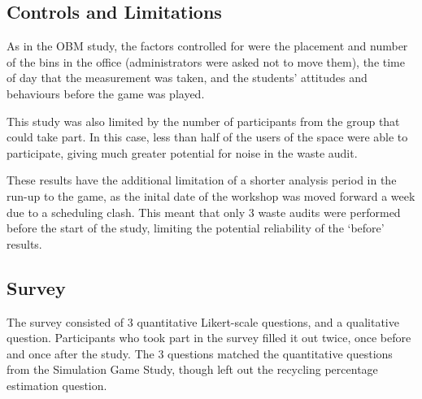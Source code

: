 \documentclass[nofonts,nols,justified,nobib]{tufte-book}
\begin{document}
\subsection*{Controls and Limitations}
As in the OBM study, the factors controlled for were the placement and number of the bins in the office (administrators were asked not to move them), the time of day that the measurement was taken, and the students' attitudes and behaviours before the game was played.

This study was also limited by the number of participants from the group that could take part. In this case, less than half of the users of the space were able to participate, giving much greater potential for noise in the waste audit. 

These results have the additional limitation of a shorter analysis period in the run-up to the game, as the inital date of the workshop was moved forward a week due to a scheduling clash. This meant that only 3 waste audits were performed before the start of the study, limiting the potential reliability of the `before' results.

\subsection*{Survey}
The survey consisted of 3 quantitative Likert-scale questions, and a qualitative question. Participants who took part in the survey filled it out twice, once before and once after the study. The 3 questions matched the quantitative questions from the Simulation Game Study, though left out the recycling percentage estimation question.
\end{document}
